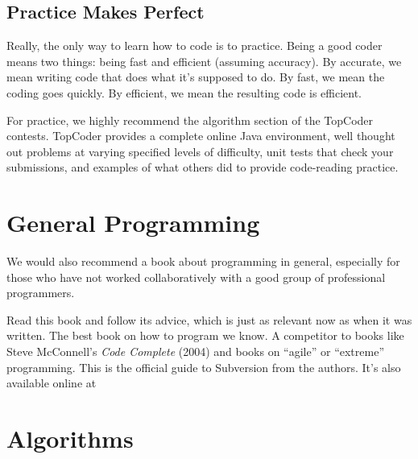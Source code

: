 \subsection{Practice Makes Perfect}

\noindent
Really, the only way to learn how to code is to practice.  Being a
good coder means two things: being fast and efficient (assuming
accuracy).  By accurate, we mean writing code that does what it's
supposed to do.  By fast, we mean the coding goes quickly.  By efficient,
we mean the resulting code is efficient.

For practice, we highly recommend the algorithm section of the
TopCoder contests.  TopCoder provides a complete online Java
environment, well thought out problems at varying specified levels of
difficulty, unit tests that check your submissions, and examples of
what others did to provide code-reading practice.
%
\begin{quote}
\end{quote}
%



\section{General Programming}

\noindent
We would also recommend a book about programming in general, 
especially for those who have not worked collaboratively with
a good group of professional programmers.
%
\begin{itemize}
{Read this book and follow its advice, which is just as relevant now
as when it was written.  The best book on how to program
we know.  A competitor to books like Steve McConnell's {\it Code Complete} (2004)
and books on ``agile'' or ``extreme'' programming.}
%
{This is the official guide to Subversion from the
authors.  It's also available online at
%
}
\end{itemize}


%


\section{Algorithms}

